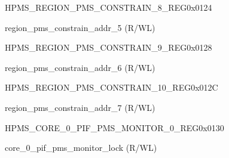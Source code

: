 \begin{register}{H}{PMS\_REGION\_PMS\_CONSTRAIN\_8\_REG}{0x0124}\label{regdesc:PMSREGIONPMSCONSTRAIN8REG}
%
%
\regnewline%
\begin{regdesc}\begin{reglist}
\label{fielddesc:PMSREGIONPMSCONSTRAINADDR5}\item [PMS\_REGION\_PMS\_CONSTRAIN\_ADDR\_5] region\_pms\_constrain\_addr\_5 (R/WL)
\end{reglist}\end{regdesc}
\end{register}


\begin{register}{H}{PMS\_REGION\_PMS\_CONSTRAIN\_9\_REG}{0x0128}\label{regdesc:PMSREGIONPMSCONSTRAIN9REG}
%
%
\regnewline%
\begin{regdesc}\begin{reglist}
\label{fielddesc:PMSREGIONPMSCONSTRAINADDR6}\item [PMS\_REGION\_PMS\_CONSTRAIN\_ADDR\_6] region\_pms\_constrain\_addr\_6 (R/WL)
\end{reglist}\end{regdesc}
\end{register}


\begin{register}{H}{PMS\_REGION\_PMS\_CONSTRAIN\_10\_REG}{0x012C}\label{regdesc:PMSREGIONPMSCONSTRAIN10REG}
%
%
\regnewline%
\begin{regdesc}\begin{reglist}
\label{fielddesc:PMSREGIONPMSCONSTRAINADDR7}\item [PMS\_REGION\_PMS\_CONSTRAIN\_ADDR\_7] region\_pms\_constrain\_addr\_7 (R/WL)
\end{reglist}\end{regdesc}
\end{register}


\begin{register}{H}{PMS\_CORE\_0\_PIF\_PMS\_MONITOR\_0\_REG}{0x0130}\label{regdesc:PMSCORE0PIFPMSMONITOR0REG}
%
%
\regnewline%
\begin{regdesc}\begin{reglist}
\label{fielddesc:PMSCORE0PIFPMSMONITORLOCK}\item [PMS\_CORE\_0\_PIF\_PMS\_MONITOR\_LOCK] core\_0\_pif\_pms\_monitor\_lock (R/WL)
\end{reglist}\end{regdesc}
\end{register}



